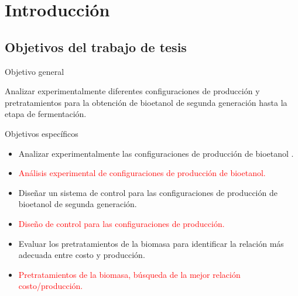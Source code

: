 \documentclass[12pt]{article}
\begin{document}
	
	\pagestyle{empty}
	
	
	\tableofcontents
	\date{}
     \newpage
	\listoftables
	\clearpage
	\newpage
	
	
	\pagestyle{plain}
	\setcounter{page}{1} 
		\section{Introducción}
	
		
		
		
	\subsection{Objetivos del trabajo de tesis}
	{\large Objetivo general}
	
	Analizar experimentalmente diferentes configuraciones de producción y pretratamientos para la obtención de bioetanol de segunda generación  hasta la etapa de fermentación. \newline \newline
	
	{\large Objetivos específicos}
	
	\begin{itemize}
		\item 
		Analizar experimentalmente las configuraciones de producción de bioetanol .
		\item \textcolor{red}{Análisis experimental de configuraciones de producción de bioetanol.}
		\item 
		Diseñar un sistema de control para las configuraciones de producción de bioetanol de segunda generación.
			
		\item \textcolor{red}{Diseño de control para las configuraciones de producción.}
		
		\item 
       Evaluar los pretratamientos de la biomasa para identificar la relación más adecuada entre costo y producción.
      \item \textcolor{red}{Pretratamientos de la biomasa, búsqueda de la mejor relación costo/producción.}
	\end{itemize}
	
\end{document}
